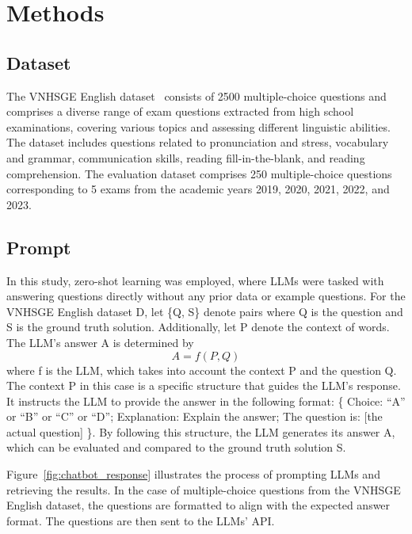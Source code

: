 \documentclass[11pt]{article}
\begin{document}
\section{Methods}

\subsection{Dataset}


The VNHSGE English dataset~\cite{dao2023vnhsge} consists of 2500 multiple-choice questions and comprises a diverse range of exam questions extracted from high school examinations, covering various topics and assessing different linguistic abilities. The dataset includes questions related to pronunciation and stress, vocabulary and grammar, communication skills, reading fill-in-the-blank, and reading comprehension. The evaluation dataset comprises 250 multiple-choice questions corresponding to 5 exams from the academic years 2019, 2020, 2021, 2022, and 2023.

\subsection{Prompt}

In this study, zero-shot learning was employed, where LLMs were tasked with answering questions directly without any prior data or example questions. For the VNHSGE English dataset D, let \{Q, S\} denote pairs where Q is the question and S is the ground truth solution. Additionally, let P denote the context of words. The LLM's answer A is determined by
\begin{equation}
	A = f(P, Q)
\end{equation}
where f is the LLM, which takes into account the context P and the question Q. The context P in this case is a specific structure that guides the LLM’s response. It instructs the LLM to provide the answer in the following format: \{ Choice: “A” or “B” or “C” or “D”;
	Explanation: Explain the answer;
	The question is: [the actual question] \}. By following this structure, the LLM generates its answer A, which can be evaluated and compared to the ground truth solution S.

Figure~\ref{fig:chatbot_response} illustrates the process of prompting LLMs and retrieving the results. In the case of multiple-choice questions from the VNHSGE English dataset, the questions are formatted to align with the expected answer format. The questions are then sent to the LLMs' API.
\end{document}
